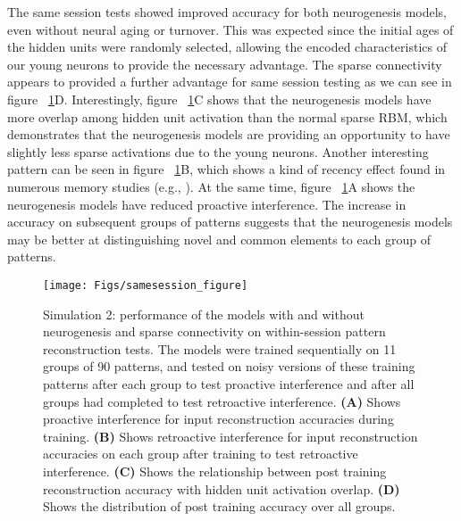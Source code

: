 The same session tests showed improved accuracy for both neurogenesis models, 
even without neural aging or turnover. 
This was expected since the initial ages of the hidden units were randomly selected, 
allowing the encoded characteristics of our young neurons to provide the necessary advantage. 
The sparse connectivity appears to provided a further advantage for same session testing 
as we can see in figure ~\ref{fig:samesession_figure}D. 
Interestingly, figure ~\ref{fig:samesession_figure}C shows that the neurogenesis models 
have more overlap among hidden unit activation than the normal sparse \ac{RBM}, 
which demonstrates that the neurogenesis models are providing an opportunity to 
have slightly less sparse activations due to the young neurons. 
Another interesting pattern can be seen in figure ~\ref{fig:samesession_figure}B, 
which shows a kind of recency effect found in numerous memory studies (e.g., \cite{serial_position_effect}).
At the same time, figure ~\ref{fig:samesession_figure}A shows the neurogenesis models have reduced 
proactive interference. 
The increase in accuracy on subsequent groups of patterns suggests that the neurogenesis models may be better at distinguishing novel and common elements to each group of patterns.

\begin{figure}[!h]
\begin{center}
\texttt{[image: Figs/samesession\_figure]}
\end{center}
\caption{ Simulation 2: performance of the models with and without neurogenesis and 
sparse connectivity on within-session pattern reconstruction tests. 
The models were trained sequentially on 11 groups of 90 patterns, and tested on 
noisy versions of these training patterns after each group to test proactive interference 
and after all groups had completed to test retroactive interference. 
\textbf{(A)} Shows proactive interference for input reconstruction accuracies during training. 
\textbf{(B)} Shows retroactive interference for input reconstruction accuracies on each group 
after training to test retroactive interference. 
\textbf{(C)} Shows the relationship between post training reconstruction accuracy with hidden unit activation overlap. \textbf{(D)} Shows the distribution of post training accuracy over all groups.}
\label{fig:samesession_figure}
\end{figure}

